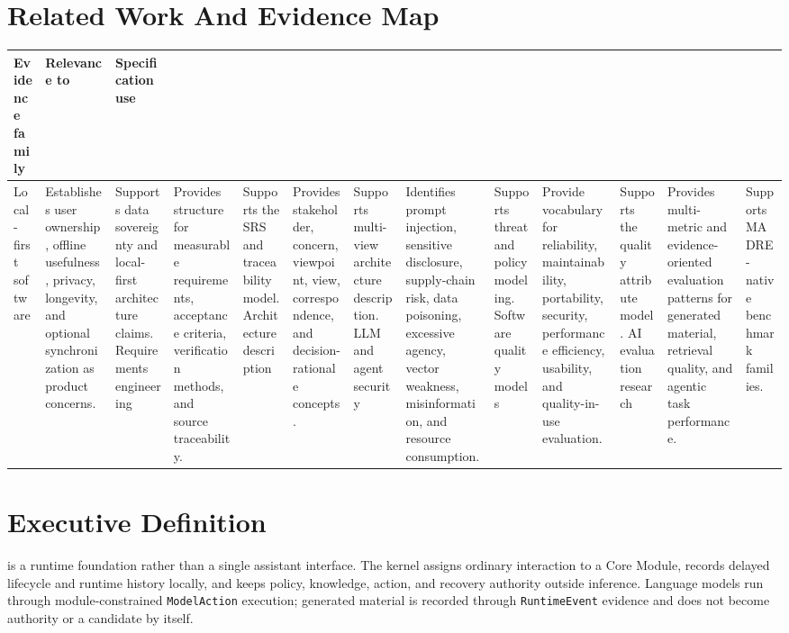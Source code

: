 \documentclass[11pt]{report}
\begin{document}
\section{Related Work And Evidence Map}

\begin{tabularx}{.95\linewidth}{@{}lX X@{}}
	\toprule
	\textbf{Evidence family} & \textbf{Relevance to \madre} & \textbf{Specification use} \\
	\midrule
	Local-first software & Establishes user ownership, offline usefulness, privacy, longevity, and optional synchronization as product concerns. & Supports data sovereignty and local-first architecture claims. \n
	Requirements engineering & Provides structure for measurable requirements, acceptance criteria, verification methods, and source traceability. & Supports the SRS and traceability model. \n
	Architecture description & Provides stakeholder, concern, viewpoint, view, correspondence, and decision-rationale concepts. & Supports multi-view architecture description. \n
	LLM and agent security & Identifies prompt injection, sensitive disclosure,	supply-chain risk, data poisoning, excessive agency, vector weakness, misinformation, and resource consumption. & Supports threat and policy modeling. \n
	Software quality models & Provide vocabulary for reliability, maintainability, portability, security, performance efficiency, usability, and quality-in-use evaluation. & Supports the quality attribute model. \n
	AI evaluation research & Provides multi-metric and evidence-oriented evaluation patterns for generated material, retrieval quality, and agentic task performance. & Supports MADRE-native benchmark families. \\
	\bottomrule
\end{tabularx}


\section{Executive Definition}

\Madre is a runtime foundation rather than a single assistant interface. The kernel assigns ordinary interaction to a Core Module, records delayed lifecycle and runtime history locally, and keeps policy, knowledge, action, and recovery authority outside inference. Language models run through module-constrained \texttt{ModelAction} execution; generated material is recorded through \texttt{RuntimeEvent} evidence and does not become authority or a candidate by itself.
\end{document}
